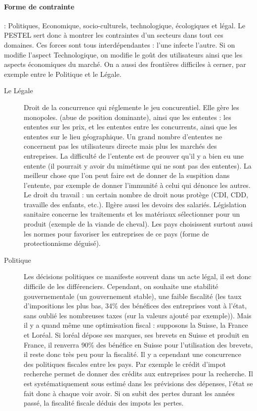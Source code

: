 \paragraph{Forme de contrainte} : Politiques, Economique, socio-culturels, technologique, écologiques et légal. Le PESTEL sert donc à montrer les contraintes d'un secteurs dans tout ces domaines.
Ces forces sont tous interdépendantes : l'une infecte l'autre. Si on modifie l'aspect Technologique, on modifie le goût des utilisateurs ainsi que les aspects économiques du marché. 
On a aussi des frontières difficiles à cerner, par exemple entre le Politique et le Légale.
\begin{description}
	\item[Le Légale] Droit de la concurrence qui réglemente le jeu concurentiel. Elle gère les monopoles. (abue de position dominante), ainsi que les ententes : les ententes sur les prix, et les ententes entre les concurrents, ainsi que les ententes sur le lieu géographique. Un grand nombre d'ententes ne concernent pas les utilisateurs directe mais plus les marchés des entreprises. La difficulté de l'entente est de prouver qu'il y a bien eu une entente (il pourrait y avoir du mimétisme qui ne sont pas des ententes). La meilleur chose que l'on peut faire est de donner de la suspition dans l'entente, par exemple de donner l'immunité à celui qui dénonce les autres. Le droit du travail : un certain nombre de droit nous protège (CDI, CDD, travaille des enfants, etc.). Ilgère aussi les devoirs des salariés. 
Législation sanitaire concerne les traitements et les matériaux sélectionner pour un produit (exemple de la viande de cheval). Les pays choisissent surtout aussi les normes pour favoriser les entreprises de ce pays (forme de protectionnisme déguisé).
	\item[Politique] Les décisions politiques ce manifeste souvent dans un acte légal, il est donc difficile de les différenciers. Cependant, on souhaite une stabilité gouvernementale (un gouvernement stable), une faible fiscalité (les taux d'impositions les plus bas, 34\% des bénéfices des entreprises vont à l'état, sans oublié les nombreuses taxes (sur la valeurs ajouté par exemple)). Mais il y a quand même une optimisation fiscal : supposons la Suisse, la France et Loréal. Si loréal dépose ses marques, ses brevets en Suisse et produit en France, il renverra 90\% des bénéfice en Suisse pour l'utilisation des brevets, il reste donc très peu pour la fiscalité. Il y a cependant une concurrence des politiques fiscales entre les pays. Par exemple le crédit d'impot recherche permet de donner des crédits aux entreprises pour la recherche. Il est systématiquement sous estimé dans les prévisions des dépenses, l'état se fait donc à chaque voir avoir. Si on subit des pertes durant les années passé, la fiscalité fiscale déduis des impots les pertes.

\end{description}
